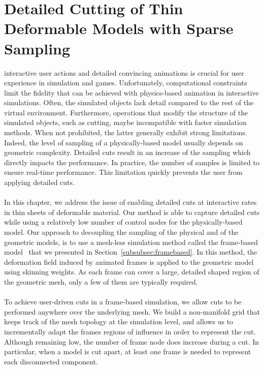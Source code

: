 \chapter[Detailed Cutting with Sparse Sampling]{Detailed Cutting of Thin Deformable Models with Sparse Sampling}
\label{chap:cutting}
 interactive user actions and detailed convincing animations is crucial for user experience in simulation and games. Unfortunately, computational constraints limit the 
fidelity that can be achieved with physics-based animation
in interactive simulations. Often, the simulated objects lack detail compared to the rest of the virtual environment.
Furthermore, operations that modify the structure of the simulated objects, such as cutting, 
maybe incompatible with faster simulation methods.
When not prohibited, the latter generally exhibit strong limitations. Indeed, the level of sampling of a physically-based model usually depends on geometric complexity. Detailed cuts result in an increase of the sampling which directly impacts the performance. In practice, the number of samples is limited to ensure real-time performance. This limitation quickly prevents the user from applying detailed cuts.  
\\ \\
In this chapter, we address the issue of enabling detailed cuts at interactive rates in  thin sheets of deformable material.
 Our method is able to capture detailed cuts while using a relatively low number of control nodes for the physically-based model.
Our approach to decoupling the sampling of the physical and of the geometric models, is to use a mesh-less simulation method called the frame-based model~\cite{Gilles2011} that we presented in Section~\ref{subsubsec:framebased}. In this method, the deformation field induced by animated frames is applied to the geometric model using skinning weights. As each frame can cover a large, detailed shaped region of the geometric mesh, only a few of them are typically required.
\\ \\
To achieve user-driven cuts in a frame-based simulation, we allow cuts to be performed anywhere over the underlying mesh.
We build a non-manifold grid that keeps track of the mesh topology at the simulation level, and allows us to incrementally adapt the frames regions of influence in order to  represent the cut.
Although remaining low, the number of frame node does increase during a cut. 
In particular, when a model is cut apart, at least one frame is needed to represent each disconnected component. 
